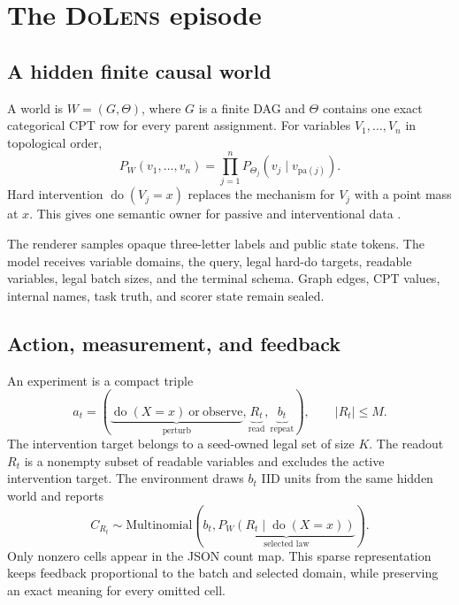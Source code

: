 \documentclass{article}
\newcommand{\method}{\textsc{DoLens}}
\newcommand{\doop}{\operatorname{do}}
\begin{document}
\section{The \method{} episode}

\subsection{A hidden finite causal world}

A world is $W=(G,\Theta)$, where $G$ is a finite DAG and $\Theta$ contains one
exact categorical CPT row for every parent assignment. For variables
$V_1,\ldots,V_n$ in topological order,
\begin{equation}
  P_W(v_1,\ldots,v_n)
  = \prod_{j=1}^{n} P_{\Theta_j}(v_j\mid v_{\mathrm{pa}(j)}).
  \label{eq:factorization}
\end{equation}
Hard intervention $\doop(V_j=x)$ replaces the mechanism for $V_j$ with a point
mass at $x$. This gives one semantic owner for passive and interventional data
\citep{pearl2009causality,peters2017elements}.

The renderer samples opaque three-letter labels and public state tokens. The
model receives variable domains, the query, legal hard-do targets, readable
variables, legal batch sizes, and the terminal schema. Graph edges, CPT values,
internal names, task truth, and scorer state remain sealed.

\subsection{Action, measurement, and feedback}

An experiment is a compact triple
\begin{equation}
  a_t=\left(
    \underbrace{\doop(X=x)\ \text{or}\ \mathrm{observe}}_{\text{perturb}},
    \underbrace{R_t}_{\text{read}},
    \underbrace{b_t}_{\text{repeat}}
  \right),
  \qquad |R_t|\le M.
  \label{eq:action}
\end{equation}
The intervention target belongs to a seed-owned legal set of size $K$. The
readout $R_t$ is a nonempty subset of readable variables and excludes the active
intervention target. The environment draws $b_t$ IID units from the same hidden
world and reports
\begin{equation}
  C_{R_t}\sim\mathrm{Multinomial}
  \left(b_t,\underbrace{P_W(R_t\mid\doop(X=x))}_{\text{selected law}}\right).
  \label{eq:feedback}
\end{equation}
Only nonzero cells appear in the JSON count map. This sparse representation keeps
feedback proportional to the batch and selected domain, while preserving an exact
meaning for every omitted cell.
\end{document}
